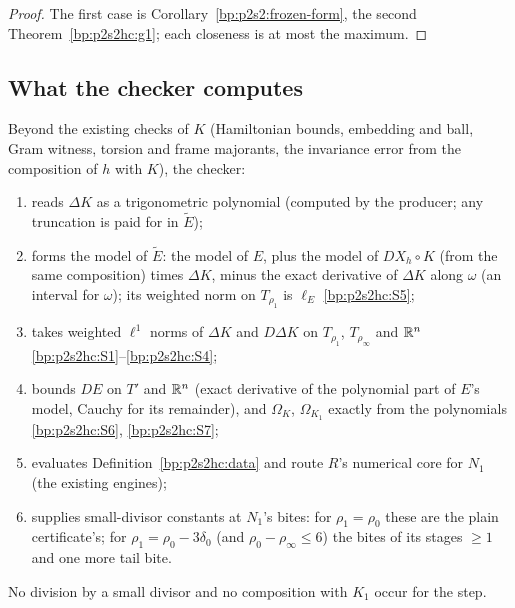 \begin{proof}
\label{step:p2s2hc:fr}
The first case is Corollary~\ref{bp:p2s2:frozen-form}, the second Theorem~\ref{bp:p2s2hc:g1}; each closeness is at most the maximum.
\end{proof}

\subsection{What the checker computes}\label{bp:p2s2hc:sec-checker}

\begin{remark}\label{bp:p2s2hc:checker}
Beyond the existing checks of $K$ (Hamiltonian bounds, embedding and ball, Gram witness, torsion and frame majorants, the invariance error
from the composition of $h$ with $K$), the checker:
\begin{enumerate}[label=(\arabic*)]
\item reads $\Delta K$ as a trigonometric polynomial (computed by the producer; any truncation is paid for in $\tilde E$);
\item forms the model of $\tilde E$: the model of $E$, plus the model of $DX_h\circ K$ (from the same composition) times $\Delta K$, minus the exact
  derivative of $\Delta K$ along $\omega$ (an interval for $\omega$); its weighted norm on $T_{\rho_1}$ is $\ell_E$ \ref{bp:p2s2hc:S5};
\item takes weighted $\ell^1$ norms of $\Delta K$ and $D\Delta K$ on $T_{\rho_1}$, $T_{\rho_\infty}$ and $\mathbb{R}^n$ \ref{bp:p2s2hc:S1}--\ref{bp:p2s2hc:S4};
\item bounds $DE$ on $T'$ and $\mathbb{R}^n$ (exact derivative of the polynomial part of $E$'s model, Cauchy for its remainder), and $\Omega_K$, $\Omega_{K_1}$
  exactly from the polynomials \ref{bp:p2s2hc:S6}, \ref{bp:p2s2hc:S7};
\item evaluates Definition~\ref{bp:p2s2hc:data} and route $R$'s numerical core for $N_1$ (the existing engines);
\item supplies small-divisor constants at $N_1$'s bites: for $\rho_1=\rho_0$ these are the plain certificate's; for $\rho_1=\rho_0-3\delta_0$ (and
  $\rho_0-\rho_\infty\le6$) the bites of its stages $\ge1$ and one more tail bite.
\end{enumerate}
No division by a small divisor and no composition with $K_1$ occur for the step.
\end{remark}

